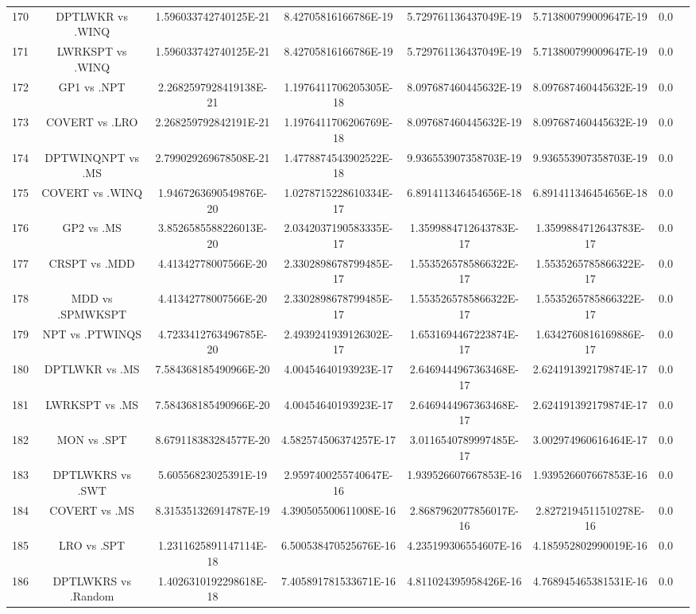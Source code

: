 \documentclass[a3paper,10pt]{article}
\begin{document}
\begin{table}[!htp]
\begin{tabular}{cccccccc}
170&DPTLWKR vs .WINQ&1.596033742740125E-21&8.42705816166786E-19&5.729761136437049E-19&5.713800799009647E-19&0.0\\
171&LWRKSPT vs .WINQ&1.596033742740125E-21&8.42705816166786E-19&5.729761136437049E-19&5.713800799009647E-19&0.0\\
172&GP1 vs .NPT&2.2682597928419138E-21&1.1976411706205305E-18&8.097687460445632E-19&8.097687460445632E-19&0.0\\
173&COVERT vs .LRO&2.268259792842191E-21&1.1976411706206769E-18&8.097687460445632E-19&8.097687460445632E-19&0.0\\
174&DPTWINQNPT vs .MS&2.799029269678508E-21&1.4778874543902522E-18&9.936553907358703E-19&9.936553907358703E-19&0.0\\
175&COVERT vs .WINQ&1.9467263690549876E-20&1.0278715228610334E-17&6.891411346454656E-18&6.891411346454656E-18&0.0\\
176&GP2 vs .MS&3.8526585588226013E-20&2.0342037190583335E-17&1.3599884712643783E-17&1.3599884712643783E-17&0.0\\
177&CRSPT vs .MDD&4.41342778007566E-20&2.3302898678799485E-17&1.5535265785866322E-17&1.5535265785866322E-17&0.0\\
178&MDD vs .SPMWKSPT&4.41342778007566E-20&2.3302898678799485E-17&1.5535265785866322E-17&1.5535265785866322E-17&0.0\\
179&NPT vs .PTWINQS&4.7233412763496785E-20&2.4939241939126302E-17&1.6531694467223874E-17&1.6342760816169886E-17&0.0\\
180&DPTLWKR vs .MS&7.584368185490966E-20&4.00454640193923E-17&2.6469444967363468E-17&2.624191392179874E-17&0.0\\
181&LWRKSPT vs .MS&7.584368185490966E-20&4.00454640193923E-17&2.6469444967363468E-17&2.624191392179874E-17&0.0\\
182&MON vs .SPT&8.679118383284577E-20&4.582574506374257E-17&3.0116540789997485E-17&3.002974960616464E-17&0.0\\
183&DPTLWKRS vs .SWT&5.60556823025391E-19&2.9597400255740647E-16&1.939526607667853E-16&1.939526607667853E-16&0.0\\
184&COVERT vs .MS&8.315351326914787E-19&4.390505500611008E-16&2.8687962077856017E-16&2.8272194511510278E-16&0.0\\
185&LRO vs .SPT&1.2311625891147114E-18&6.500538470525676E-16&4.235199306554607E-16&4.185952802990019E-16&0.0\\
186&DPTLWKRS vs .Random&1.4026310192298618E-18&7.405891781533671E-16&4.811024395958426E-16&4.768945465381531E-16&0.0\\

\end{tabular}
\end{table}
\end{document}
